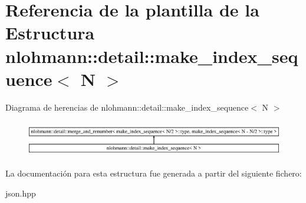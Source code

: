 \hypertarget{structnlohmann_1_1detail_1_1make__index__sequence}{}\section{Referencia de la plantilla de la Estructura nlohmann\+:\+:detail\+:\+:make\+\_\+index\+\_\+sequence$<$ N $>$}
\label{structnlohmann_1_1detail_1_1make__index__sequence}
Diagrama de herencias de nlohmann\+:\+:detail\+:\+:make\+\_\+index\+\_\+sequence$<$ N $>$\begin{figure}[H]
\begin{center}
\leavevmode
\includegraphics[height=1.597718cm]{structnlohmann_1_1detail_1_1make__index__sequence}
\end{center}
\end{figure}


La documentación para esta estructura fue generada a partir del siguiente fichero\+:\begin{DoxyCompactItemize}
\item 
json.\+hpp\end{DoxyCompactItemize}
